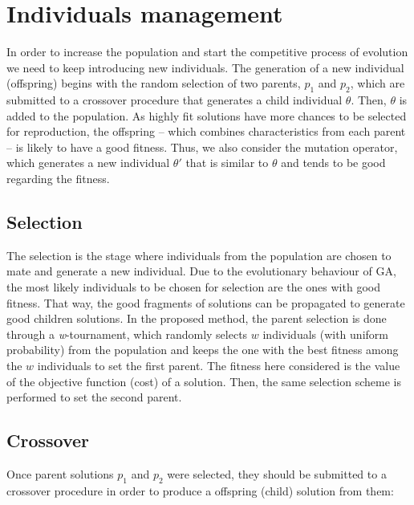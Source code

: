 \section{Individuals management}
In order to increase the population and start the competitive process of evolution we need to keep introducing new individuals. The generation of a new individual (offspring) begins with the random selection of two parents, $p_1$ and $p_2$, which are submitted to a crossover procedure that generates a child individual $\theta$. Then, $\theta$ is added to the population. As highly fit solutions have more chances to be selected for reproduction, the offspring -- which combines characteristics from each parent -- is likely to have a good fitness. Thus, we also consider the mutation operator, which generates a new individual $\theta'$ that is similar to $\theta$ and tends to be good regarding the fitness.

\subsection{Selection}
The selection is the stage where individuals from the population are chosen to mate and generate a new individual. Due to the evolutionary behaviour of GA, the most likely individuals to be chosen for selection are the ones with good fitness. That way, the good fragments of solutions can be propagated to generate good children solutions. In the proposed method, the parent selection is done through a \textit{w}-tournament, which randomly selects $w$ individuals (with uniform probability) from the population and keeps the one with the best fitness among the $w$ individuals to set the first parent. The fitness here considered is the value of the objective function (cost) of a solution. Then, the same selection scheme is performed to set the second parent.

\subsection{Crossover}
Once parent solutions $p_1$ and $p_2$ were selected, they should be submitted to a crossover procedure in order to produce a offspring (child) solution from them:


